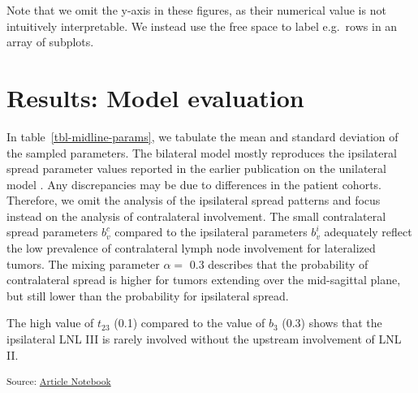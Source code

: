 \documentclass[
  sn-mathphys-num,
]{sn-jnl}
\begin{document}
Note that we omit the y-axis in these figures, as their numerical value
is not intuitively interpretable. We instead use the free space to label
e.g.~rows in an array of subplots.

\section{Results: Model evaluation}\label{sec-results}

In table~\ref{tbl-midline-params}, we tabulate the mean and standard
deviation of the sampled parameters. The bilateral model mostly
reproduces the ipsilateral spread parameter values reported in the
earlier publication on the unilateral model
\citep{ludwig_modelling_2023}. Any discrepancies may be due to
differences in the patient cohorts. Therefore, we omit the analysis of
the ipsilateral spread patterns and focus instead on the analysis of
contralateral involvement. The small contralateral spread parameters
\(b^c_v\) compared to the ipsilateral parameters \(b^i_v\) adequately
reflect the low prevalence of contralateral lymph node involvement for
lateralized tumors. The mixing parameter \(\alpha=\) 0.3 describes that
the probability of contralateral spread is higher for tumors extending
over the mid-sagittal plane, but still lower than the probability for
ipsilateral spread.

The high value of \(t_{23}\) (0.1) compared to the value of \(b_3\)
(0.3) shows that the ipsilateral LNL III is rarely involved without the
upstream involvement of LNL II.

\textsubscript{Source:
\href{https://rmnldwg.github.io/bilateral-paper/manuscript.qmd.html}{Article
Notebook}}
\end{document}
